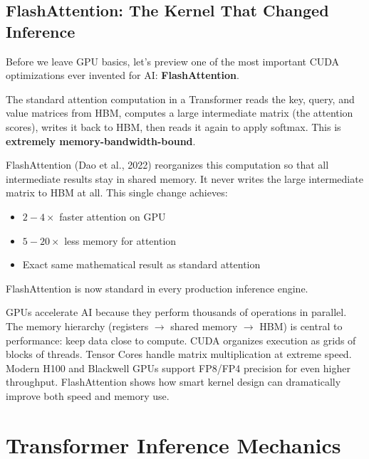 \documentclass[10pt, oneside, openany]{book}
\newenvironment{chapsummary}
  {\begin{tcolorbox}[enhanced, breakable,
    colback={rgb,255:red,245;green,245;blue,225},
    colframe=AccentOrange, boxrule=1.5pt, arc=4pt,
    title={\bfseries Chapter Summary},
    fonttitle=\bfseries\color{white},
    attach boxed title to top left={yshift=-2mm, xshift=5mm},
    boxed title style={colback=AccentOrange, arc=2pt}]}
  {\end{tcolorbox}}
\newcommand{\keyterm}[1]{\textbf{\color{AccentOrange}#1}}
\begin{document}
\section{FlashAttention: The Kernel That Changed Inference}

Before we leave GPU basics, let's preview one of the most important CUDA
optimizations ever invented for AI: \keyterm{FlashAttention}.

The standard attention computation in a Transformer reads the key, query, and
value matrices from HBM, computes a large intermediate matrix (the attention
scores), writes it back to HBM, then reads it again to apply softmax.  This is
\textbf{extremely memory-bandwidth-bound}.

FlashAttention (Dao et al., 2022) reorganizes this computation so that all
intermediate results stay in shared memory.  It never writes the large intermediate
matrix to HBM at all.  This single change achieves:

\begin{itemize}
  \item $2-4\times$ faster attention on GPU
  \item $5-20\times$ less memory for attention
  \item Exact same mathematical result as standard attention
\end{itemize}

FlashAttention is now standard in every production inference engine.

\begin{chapsummary}
GPUs accelerate AI because they perform thousands of operations in parallel.
The memory hierarchy (registers $\to$ shared memory $\to$ HBM) is central to
performance: keep data close to compute.  CUDA organizes execution as grids of
blocks of threads.  Tensor Cores handle matrix multiplication at extreme speed.
Modern H100 and Blackwell GPUs support FP8/FP4 precision for even higher
throughput.  FlashAttention shows how smart kernel design can dramatically improve
both speed and memory use.
\end{chapsummary}

\chapter{Transformer Inference Mechanics}
\label{ch:transformer}
\end{document}
